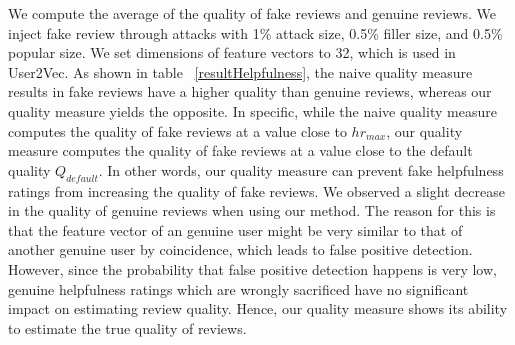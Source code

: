 \documentclass[master,english,final]{kaist-ucs}
\begin{document}


We compute the average of the quality of fake reviews and genuine reviews.
We inject fake review through attacks with 1\% attack size, 0.5\% filler size, and 0.5\% popular size.
We set dimensions of feature vectors to 32, which is used in User2Vec.
As shown in table ~\ref{resultHelpfulness}, the naive quality measure results in fake reviews have a higher quality than genuine reviews, whereas our quality measure yields the opposite.
In specific, while the naive quality measure computes the quality of fake reviews at a value close to $hr_{max}$, our quality measure computes the quality of fake reviews at a value close to the default quality $Q_{default}$.
In other words, our quality measure can prevent fake helpfulness ratings from increasing the quality of fake reviews.
We observed a slight decrease in the quality of genuine reviews when using our method.
The reason for this is that the feature vector of an genuine user might be very similar to that of another genuine user by coincidence, which leads to false positive detection.
However, since the probability that false positive detection happens is very low, genuine helpfulness ratings which are wrongly sacrificed have no significant impact on estimating review quality.
Hence, our quality measure shows its ability to estimate the true quality of reviews.

\end{document}
